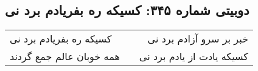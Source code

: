 \begin{center}
\section*{دوبیتی شماره ۳۴۵: کسیکه ره بفریادم برد نی}
\label{sec:345}
\begin{longtable}{l p{0.5cm} r}
کسیکه ره بفریادم برد نی
&&
خبر بر سرو آزادم برد نی
\\
همه خوبان عالم جمع گردند
&&
کسیکه یادت از یادم برد نی
\\
\end{longtable}
\end{center}
